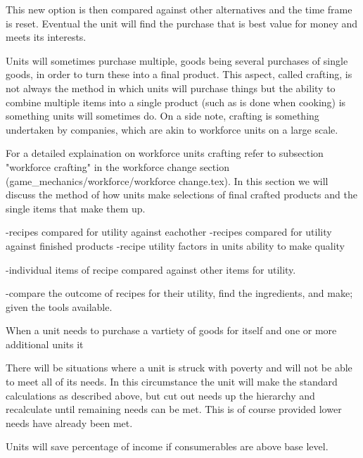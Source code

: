 This new option is then compared against other alternatives and the time frame is reset. Eventual the unit will find the purchase that is best value for money and meets its interests.


Units will sometimes purchase multiple, goods being several purchases of single goods, in order to turn these into a final product. This aspect, called crafting, is not always the method in which units will purchase things but the ability to combine multiple items into a single product (such as is done when cooking) is something units will sometimes do. On a side note, crafting is something undertaken by companies, which are akin to workforce units on a large scale.

For a detailed explaination on workforce units crafting refer to subsection "workforce crafting" in the workforce change section (game_mechanics/workforce/workforce change.tex). In this section we will discuss the method of how units make selections of final crafted products and the single items that make them up. 

-recipes compared for utility against eachother
-recipes compared for utility against finished products
-recipe utility factors in units ability to make quality

-individual items of recipe compared against other items for utility.

-compare the outcome of recipes for their utility, find the ingredients, and make; given the tools available.








When a unit needs to purchase a vartiety of goods for itself and one or more additional units it



There will be situations where a unit is struck with poverty and will not be able to meet all of its needs. In this circumstance the unit will make the standard calculations as described above, but cut out needs up the hierarchy and recalculate until remaining needs can be met. This is of course provided lower needs have already been met.



Units will save percentage of income if consumerables are above base level.

